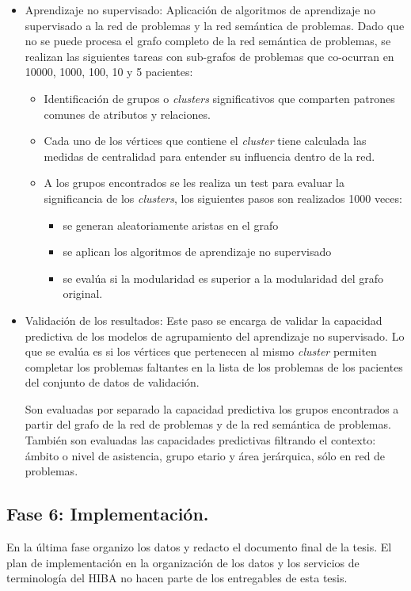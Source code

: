 \begin{itemize}
\item Aprendizaje no supervisado: Aplicación de algoritmos de aprendizaje no supervisado a la red de problemas y la red semántica de problemas. Dado que no se puede procesa el grafo completo de la red semántica de problemas, se realizan las siguientes tareas con sub-grafos de problemas que co-ocurran en \num{10000}, \num{1000}, \num{100}, \num{10} y \num{5} pacientes:
\begin{itemize}
    \item Identificación de grupos o \textit{clusters} significativos que comparten patrones comunes de atributos y relaciones. 
    \item Cada uno de los vértices que contiene el \textit{cluster} tiene calculada las medidas de centralidad para entender su influencia dentro de la red. 
    \item A los grupos encontrados se les realiza un test para evaluar la significancia de los \textit{clusters}, los siguientes pasos son realizados 1000 veces:
    \begin{itemize}
\item  se generan aleatoriamente aristas en el grafo
\item  se aplican los algoritmos de aprendizaje no supervisado
\item  se evalúa si la modularidad es superior a la modularidad del grafo original.
\end{itemize}
\end{itemize}

\item Validación de los resultados: Este paso se encarga de validar la capacidad predictiva de los modelos de agrupamiento del aprendizaje no supervisado. Lo que se evalúa es si los vértices que pertenecen al mismo \textit{cluster} permiten completar los problemas faltantes en la lista de los problemas de los pacientes del conjunto de datos de validación. 

Son evaluadas por separado la capacidad predictiva  los grupos encontrados a partir del grafo de la red de problemas y de la red semántica de problemas. También son evaluadas las capacidades predictivas filtrando el contexto: ámbito o nivel de asistencia, grupo etario y área jerárquica, sólo en red de problemas.
 \end{itemize}
 
\subsection{Fase 6: Implementación.} En la última fase organizo los datos y redacto el documento final de la tesis. El plan de implementación en la organización de los datos y los servicios de terminología del \acrshort{HIBA} no hacen parte de los entregables de esta tesis.

